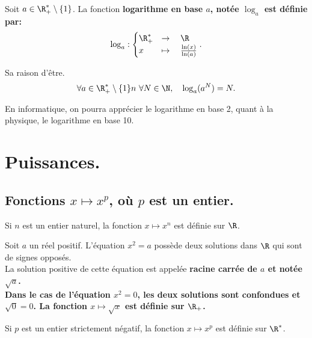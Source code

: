 \documentclass[11pt]{article}
\begin{document}
\begin{defi}{}{}
    Soit $a\in\R^*_+\setminus\{1\}$. La fonction \bf{logarithme en base $a$}, notée $\log_a$ est définie par:
    \begin{equation*}
        \log_a:\begin{cases}
            \R_+^*&\to\quad\R\\
            x&\mapsto\quad\frac{\ln(x)}{\ln(a)}
        \end{cases}.
    \end{equation*}
\end{defi}

\begin{prop}{Sa raison d'être.}{}
    \begin{equation*}
        \forall a \in \R^*_+\setminus\{1\}n~\forall N\in\N,\quad\log_a(a^N)=N.
    \end{equation*}
\end{prop}

En informatique, on pourra apprécier le logarithme en base 2, quant à la physique, le logarithme en base 10.

\section{Puissances.}

\subsection{Fonctions \texorpdfstring{$x\mapsto x^p$}{Lg}, où \texorpdfstring{$p$}{Lg} est un entier.}

\begin{defi}{}{}
    Si $n$ est un entier naturel, la fonction $x\mapsto x^n$ est définie sur $\R$.
\end{defi}

\begin{defi}{}{}
    Soit $a$ un réel positif. L'équation $x^2=a$ possède deux solutions dans $\R$ qui sont de signes opposés.\\
    La solution positive de cette équation est appelée \bf{racine carrée} de $a$ et notée $\sqrt{a}$.\\
    Dans le cas de l'équation $x^2=0$, les deux solutions sont confondues et $\sqrt{0}=0$.\n
    La fonction $x\mapsto\sqrt{x}$ est définie sur $\R_+$.
\end{defi}

\begin{defi}{}{}
    Si $p$ est un entier strictement négatif, la fonction $x\mapsto x^p$ est définie sur $\R^*$.
\end{defi}
\end{document}
